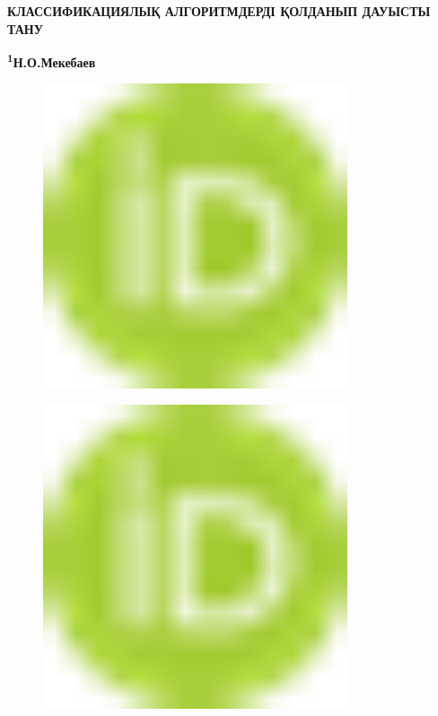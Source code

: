 
{\bfseries КЛАССИФИКАЦИЯЛЫҚ АЛГОРИТМДЕРДІ ҚОЛДАНЫП ДАУЫСТЫ ТАНУ}

{\bfseries \textsuperscript{1}Н.О.Мекебаев}
\begin{figure}[H]
	\centering
	\includegraphics[width=0.8\textwidth]{media/ict/image1}
	\caption*{}
\end{figure}

\begin{figure}[H]
	\centering
	\includegraphics[width=0.8\textwidth]{media/ict/image1}
	\caption*{}
\end{figure}

